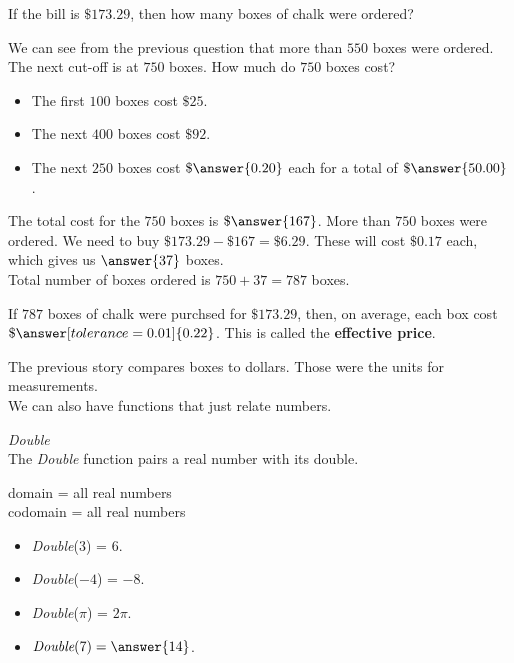 \documentclass{ximera}
\begin{document}
\begin{question}
If the bill is $\$173.29$, then how many boxes of chalk were ordered?

\begin{explanation}

We can see from the previous question that more than $550$ boxes were ordered.  The next cut-off is at $750$ boxes.  How much do $750$ boxes cost? \\

\begin{itemize}
\item The first $100$ boxes cost $\$25$.
\item The next $400$ boxes cost $\$92$.
\item The next $250$ boxes cost $\$\answer{0.20}$ each for a total of $\$\answer{50.00}$.
\end{itemize}
The total cost for the $750$ boxes is $\$\answer{167}$. More than $750$ boxes were ordered.  We need to buy $\$173.29 - \$167 = \$6.29$.  These will cost $\$0.17$ each, which gives us $\answer{37}$ boxes.  \\


Total number of boxes ordered is $750 + 37 = 787$ boxes.


\end{explanation}



If $787$ boxes of chalk were purchsed for $\$173.29$, then, on average, each box cost $\$\answer[tolerance=0.01]{0.22}$. This is called the \textbf{effective price}.
\end{question}



The previous story compares boxes to dollars.  Those were the units for measurements. \\



We can also have functions that just relate numbers. \\







\begin{question} \textit{Double} \\
The \textit{Double} function pairs a real number with its double.

domain = all real numbers  \\ 
codomain = all real numbers


\begin{itemize}
\item \textit{Double}($3$) = $6$.
\item \textit{Double}($-4$) = $-8$.
\item \textit{Double}($\pi$) = $2 \pi$.

\item $\textit{Double}(7) = \answer{14}$.
\end{itemize}

\end{question} 
\end{document}
